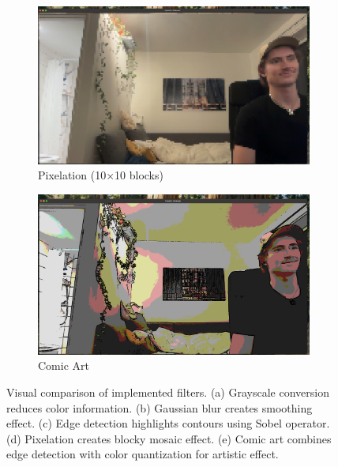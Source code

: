 \documentclass[12pt,a4paper]{article}
\begin{document}
\begin{figure}[H]
    \begin{subfigure}[b]{0.20\textwidth}
        \centering
        \includegraphics[width=\textwidth]{filters/pixelatio.png}
        \caption{Pixelation (10×10 blocks)}
        \label{fig:filter_pixelation}
    \end{subfigure}
    \hfill
    \begin{subfigure}[b]{0.20\textwidth}
        \centering
        \includegraphics[width=\textwidth]{filters/comic.png}
        \caption{Comic Art}
        \label{fig:filter_comic}
    \end{subfigure}

    \caption{Visual comparison of implemented filters. (a) Grayscale conversion reduces color information. (b) Gaussian blur creates smoothing effect. (c) Edge detection highlights contours using Sobel operator. (d) Pixelation creates blocky mosaic effect. (e) Comic art combines edge detection with color quantization for artistic effect.}
    \label{fig:filter_comparison}
\end{figure}
\end{document}
